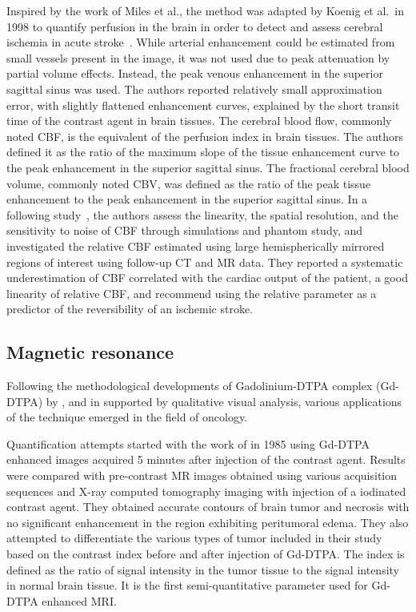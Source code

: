 Inspired by the work of Miles et al., the method was adapted by Koenig et al.~in 1998 to quantify perfusion in the brain in order to detect and assess cerebral ischemia in acute stroke~\cite{Koenig:1998ir}. 
While arterial enhancement could be estimated from small vessels present in the image, it was not used due to peak attenuation by partial volume effects. 
Instead, the peak venous enhancement in the superior sagittal sinus was used. 
The authors reported relatively small approximation error, with slightly flattened enhancement curves, explained by the short transit time of the contrast agent in brain tissues.
The cerebral blood flow, commonly noted CBF, is the equivalent of the perfusion index in brain tissues. 
The authors defined it as the ratio of the maximum slope of the tissue enhancement curve to the peak enhancement in the superior sagittal sinus.
The fractional cerebral blood volume, commonly noted CBV, was defined as the ratio of the peak tissue enhancement to the peak enhancement in the superior sagittal sinus. 
In a following study~\cite{Klotz:1999ef}, the authors assess the linearity, the spatial resolution, and the sensitivity to noise of CBF through simulations and phantom study, and investigated the relative CBF estimated using large hemispherically mirrored regions of interest using follow-up CT and MR data. 
They reported a systematic underestimation of CBF correlated with the cardiac output of the patient, a good linearity of relative CBF, and recommend using the relative parameter as a predictor of the reversibility of an ischemic stroke.


\subsection{Magnetic resonance}
\label{sec:SQMR}
Following the methodological developments of Gadolinium-DTPA complex (Gd-DTPA) by \citet{Weinmann:1984gv,Brasch:1984cz}, and \citet{Wesbey:1984is} in \citeyear{Weinmann:1984gv} supported by qualitative visual analysis, various applications of the technique emerged in the field of oncology.

Quantification attempts started with the work of \citet{Felix:1985fv} in 1985 using Gd-DTPA enhanced images acquired 5 minutes after injection of the contrast agent. 
Results were compared with pre-contrast MR images obtained using various acquisition sequences and X-ray computed tomography imaging with injection of a iodinated contrast agent. 
They obtained accurate contours of brain tumor and necrosis with no significant enhancement in the region exhibiting peritumoral edema.
They also attempted to differentiate the various types of tumor included in their study based on the contrast index before and after injection of Gd-DTPA. 
The index is defined as the ratio of signal intensity in the tumor tissue to the signal intensity in normal brain tissue. 
It is the first semi-quantitative parameter used for Gd-DTPA enhanced MRI. %

